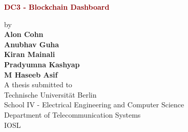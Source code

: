 \begin{titlepage}
	\strut
	\hfill
	\begin{center}
	\vspace{1cm}
		\Huge
		\begin{spacing}{.9}
			\textcolor{DarkRed}{\textbf{DC3 - Blockchain Dashboard}}\\
		\end{spacing}
		\vspace{0.8cm}
		\large
		by\\
		\vspace{0.8cm}
		\textbf{Alon Cohn}\\
		\textbf{Anubhav Guha}\\
		\textbf{Kiran Mainali }\\
		\textbf{Pradyumna Kashyap}\\
		\textbf{M Haseeb Asif}\\
		\vspace{0.8cm}
		\vspace{2cm}
	 	A thesis submitted to\\
		\vspace{0.5cm}
		Technische Universität Berlin\\
		School IV - Electrical Engineering and Computer Science\\
		Department of Telecommunication Systems\\
		IOSL\\

\end{center}
\end{titlepage}
